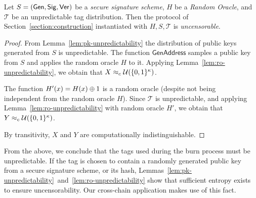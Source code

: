 \begin{theorem}[Uncensorability]
  Let $S = (\mathsf{Gen}, \mathsf{Sig}, \mathsf{Ver})$ be a \emph{secure signature scheme},
  $H$ be a \emph{Random Oracle},
  and $\mathcal{T}$ be an unpredictable tag distribution.
  Then the protocol of Section~\ref{section:construction} instantiated with
  $H, S, \mathcal{T}$ is \emph{uncensorable}.
\end{theorem}
\begin{proof}
  From Lemma~\ref{lem:pk-unpredictability} the distribution of
  public keys generated from $S$ is unpredictable. The
  function $\textsf{GenAddress}$ samples a public key from $S$ and applies the
  random oracle $H$ to it. Applying
  Lemma~\ref{lem:ro-unpredictability}, we obtain that
  $X \approx_c \mathcal{U}(\{0, 1\}^\kappa)$.

  The function $H'(x) = H(x) \oplus 1$ is a random oracle (despite not
  being independent from the random oracle $H$).
  Since $\mathcal{T}$ is unpredictable, and
  applying Lemma~\ref{lem:ro-unpredictability} with random oracle $H'$, we
  obtain that $Y \approx_c \mathcal{U}(\{0, 1\}^\kappa)$.

  By transitivity, $X$ and $Y$ are computationally indistinguishable.
\end{proof}

From the above, we conclude that the tags used during the burn process must be
unpredictable. If the tag is chosen to contain a randomly generated public key
from a secure signature scheme, or its hash,
Lemmas~\ref{lem:pk-unpredictability}~and~\ref{lem:ro-unpredictability} show that
sufficient entropy exists to ensure uncensorability. Our cross-chain application
makes use of this fact.
